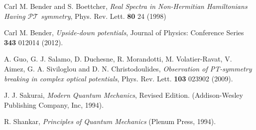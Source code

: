 \documentclass{article}
\begin{document}
\noindent [1] Carl M. Bender and S. Boettcher, \textit{Real Spectra in Non-Hermitian Hamiltonians Having $\mathcal{PT}$ symmetry}, Phys. Rev. Lett. \textbf{80} 24 (1998)

\noindent [2] Carl M. Bender, \textit{Upside-down potentials}, Journal of Physics: Conference Series \textbf{343} 012014 (2012).

\noindent [3] A. Guo, G. J. Salamo, D. Duchesne, R. Morandotti, M. Volatier-Ravat, V. Aimez, G. A. Siviloglou and D. N. Christodoulides, \textit{Observation of PT-symmetry breaking in complex optical potentials}, Phys. Rev. Lett. \textbf{103} 023902 (2009).

\noindent [4] J. J. Sakurai, \textit{Modern Quantum Mechanics}, Revised Edition. (Addison-Wesley Publishing Company, Inc, 1994).

\noindent [5] R. Shankar, \textit{Principles of Quantum Mechanics} (Plenum Press, 1994).
\end{document}
